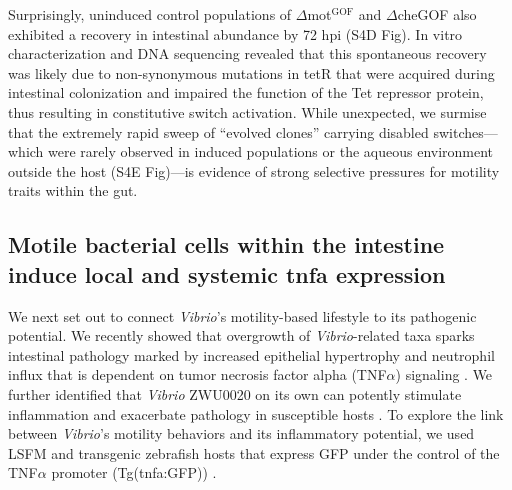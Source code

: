 Surprisingly, uninduced control populations of $\Delta$mot$^{\text{GOF}}$ and $\Delta$cheGOF also exhibited a recovery in intestinal abundance by 72 hpi (S4D Fig). In vitro characterization and DNA sequencing revealed that this spontaneous recovery was likely due to non-synonymous mutations in tetR that were acquired during intestinal colonization and impaired the function of the Tet repressor protein, thus resulting in constitutive switch activation. While unexpected, we surmise that the extremely rapid sweep of ``evolved clones'' carrying disabled switches—which were rarely observed in induced populations or the aqueous environment outside the host (S4E Fig)—is evidence of strong selective pressures for motility traits within the gut. 


\subsection{Motile bacterial cells within the intestine induce local and systemic tnfa expression}
We next set out to connect \textit{Vibrio}'s motility-based lifestyle to its pathogenic potential. We recently showed that overgrowth of \textit{Vibrio}-related taxa sparks intestinal pathology marked by increased epithelial hypertrophy and neutrophil influx that is dependent on tumor necrosis factor alpha (TNF$\alpha$) signaling \cite{rolig_enteric_2017}. We further identified that \textit{Vibrio} ZWU0020 on its own can potently stimulate inflammation \cite{rolig_individual_2015} and exacerbate pathology in susceptible hosts \cite{rolig_enteric_2017}. To explore the link between \textit{Vibrio}'s motility behaviors and its inflammatory potential, we used LSFM and transgenic zebrafish hosts that express GFP under the control of the TNF$\alpha$ promoter (Tg(tnfa:GFP)) \cite{marjoram_epigenetic_2015}. 

